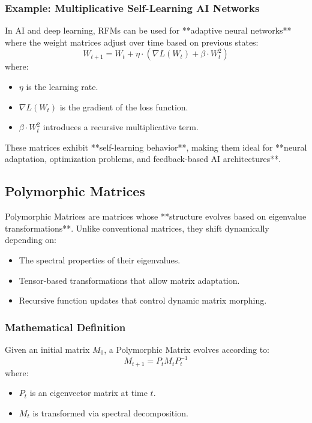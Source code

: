\documentclass{article}
\theoremstyle{plain}
\begin{document}
\subsubsection{Example: Multiplicative Self-Learning AI Networks}
In AI and deep learning, RFMs can be used for **adaptive neural networks** where the weight matrices adjust over time based on previous states:
\begin{equation}
    W_{t+1} = W_t + \eta \cdot (\nabla L(W_t) + \beta \cdot W_t^2)
\end{equation}
where:
\begin{itemize}
    \item \( \eta \) is the learning rate.
    \item \( \nabla L(W_t) \) is the gradient of the loss function.
    \item \( \beta \cdot W_t^2 \) introduces a recursive multiplicative term.
\end{itemize}

These matrices exhibit **self-learning behavior**, making them ideal for **neural adaptation, optimization problems, and feedback-based AI architectures**.

\subsection{Polymorphic Matrices}

Polymorphic Matrices are matrices whose **structure evolves based on eigenvalue transformations**. Unlike conventional matrices, they shift dynamically depending on:
\begin{itemize}
    \item The spectral properties of their eigenvalues.
    \item Tensor-based transformations that allow matrix adaptation.
    \item Recursive function updates that control dynamic matrix morphing.
\end{itemize}

\subsubsection{Mathematical Definition}
Given an initial matrix \( M_0 \), a Polymorphic Matrix evolves according to:
\begin{equation}
    M_{t+1} = P_t M_t P_t^{-1}
\end{equation}
where:
\begin{itemize}
    \item \( P_t \) is an eigenvector matrix at time \( t \).
    \item \( M_t \) is transformed via spectral decomposition.
\end{itemize}
\end{document}
